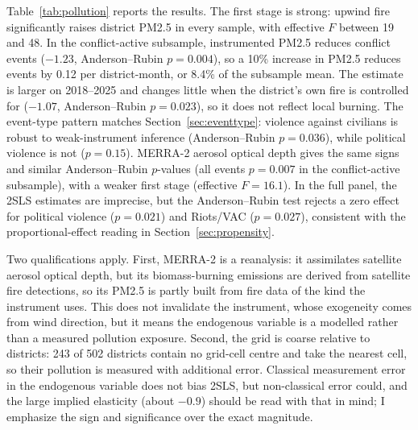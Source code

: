 \documentclass[12pt]{article}
\begin{document}
Table~\ref{tab:pollution} reports the results. The first stage is strong: upwind fire significantly raises district PM2.5 in every sample, with effective $F$ between 19 and 48. In the conflict-active subsample, instrumented PM2.5 reduces conflict events ($-1.23$, Anderson--Rubin $p=0.004$), so a 10\% increase in PM2.5 reduces events by 0.12 per district-month, or 8.4\% of the subsample mean. The estimate is larger on 2018--2025 and changes little when the district's own fire is controlled for ($-1.07$, Anderson--Rubin $p=0.023$), so it does not reflect local burning. The event-type pattern matches Section~\ref{sec:eventtype}: violence against civilians is robust to weak-instrument inference (Anderson--Rubin $p=0.036$), while political violence is not ($p=0.15$). MERRA-2 aerosol optical depth gives the same signs and similar Anderson--Rubin $p$-values (all events $p=0.007$ in the conflict-active subsample), with a weaker first stage (effective $F = 16.1$). In the full panel, the 2SLS estimates are imprecise, but the Anderson--Rubin test rejects a zero effect for political violence ($p=0.021$) and Riots/VAC ($p=0.027$), consistent with the proportional-effect reading in Section~\ref{sec:propensity}.

Two qualifications apply. First, MERRA-2 is a reanalysis: it assimilates satellite aerosol optical depth, but its biomass-burning emissions are derived from satellite fire detections, so its PM2.5 is partly built from fire data of the kind the instrument uses. This does not invalidate the instrument, whose exogeneity comes from wind direction, but it means the endogenous variable is a modelled rather than a measured pollution exposure. Second, the grid is coarse relative to districts: 243 of 502 districts contain no grid-cell centre and take the nearest cell, so their pollution is measured with additional error. Classical measurement error in the endogenous variable does not bias 2SLS, but non-classical error could, and the large implied elasticity (about $-0.9$) should be read with that in mind; I emphasize the sign and significance over the exact magnitude.
\end{document}

